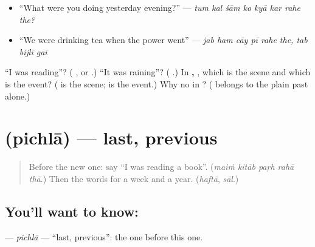 \begin{itemize}
\raggedright
  \item \textquotedblleft{}What were you doing yesterday evening?\textquotedblright{} — \emph{tum kal śām ko kyā kar rahe the?}
  \item \textquotedblleft{}We were drinking tea when the power went\textquotedblright{} — \emph{jab ham cāy pī rahe the, tab bijlī gaī}
\end{itemize}

\begin{tcolorbox}[breakable,colback=teal!4,colframe=teal!35!black,title={Before you move on}]
\textquotedblleft{}I was reading\textquotedblright{}? (\textbf{   }, or \textbf{  }.) \textquotedblleft{}It was raining\textquotedblright{}? (\textbf{   }.) In \textbf{     ,   }, which is the scene and which is the event? (\textbf{  } is the scene; \textbf{} is the event.) Why no \textbf{} in \textbf{    }? (\textbf{} belongs to the plain past alone.)
\end{tcolorbox}
\section[\texorpdfstring{\hi{पिछला} (pichlā)}{पिछला (pichlā)}]{ (pichlā) — last, previous}

\label{lesson:HI-C278-pichla}



\begin{quote}
Before the new one: say \textquotedblleft{}I was reading a book\textquotedblright{}. (\emph{maiṁ kitāb paṛh rahā thā}.) Then the words for a week and a year. (\emph{haftā}, \emph{sāl}.)
\end{quote}

\subsection*{You'll want to know: }
\textbf{} — \emph{pichlā} — \textquotedblleft{}last, previous\textquotedblright{}: the one before this one.

\begin{quote}
\textbf{    }
\end{quote}

